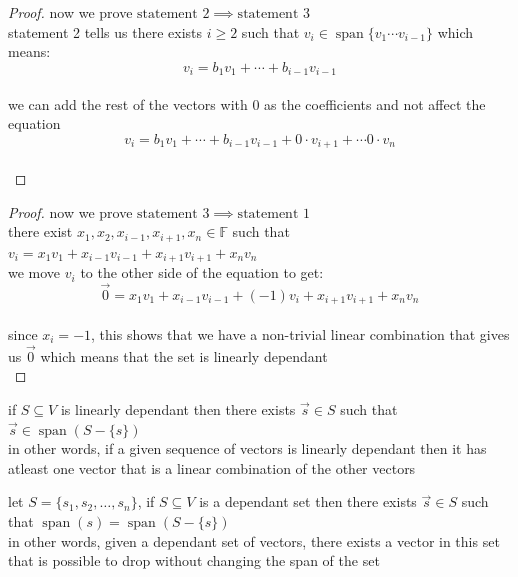 \documentclass[a4paper,12pt]{article}
\DeclareMathOperator{\spn}{span}
\begin{document}
\begin{definition}
\begin{lemma}
\begin{proof}
now we prove \(\text{statement } 2 \implies \text{statement } 3\)\\
statement 2 tells us there exists \(i \geq 2\) such that \(v_i \in \spn\{v_1 \cdots v_{i-1}\}\) which means:\\
\[
  v_i = b_1v_1 + \cdots + b_{i-1}v_{i-1}
\]\\
we can add the rest of the vectors with 0 as the coefficients and not affect the equation\\
\[
  v_i = b_1v_1 + \cdots + b_{i-1}v_{i-1} + 0 \cdot v_{i+1} + \cdots 0 \cdot v_n
\]\\
\end{proof}

\begin{proof}
now we prove \(\text{statement } 3 \implies \text{statement } 1\)\\
there exist \(x_1, x_2, x_{i-1}, x_{i+1}, x_n \in \mathbb{F}\) such that \(v_i = x_1v_1 + x_{i-1}v_{i-1} + x_{i+1}v_{i+1} + x_nv_n\)\\
we move \(v_i\) to the other side of the equation to get:\\
\[
  \vec0 = x_1v_1 + x_{i-1}v_{i-1} + (-1)v_i + x_{i+1}v_{i+1} + x_nv_n
\]\\
since \(x_i=-1\), this shows that we have a non-trivial linear combination that gives us \(\vec0\) which means that the set is linearly dependant\\
\end{proof}

\begin{entailment}
if \(S \subseteq V\) is linearly dependant then there exists \(\vec s \in S\) such that \(\vec s \in \spn(S - \{s\})\)\\
in other words, if a given sequence of vectors is linearly dependant then it has atleast one vector that is a linear combination of the other vectors\\
\label{org7800c26}
\end{entailment}
\end{lemma}

\begin{lemma}
let \(S = \{s_1,s_2,\ldots,s_n\}\), if \(S \subseteq V\) is a dependant set then there exists \(\vec s \in S\) such that \(\spn(s) = \spn(S - \{s\})\)\\
in other words, given a dependant set of vectors, there exists a vector in this set that is possible to drop without changing the span of the set\\


\end{lemma}
\end{definition}
\end{document}
